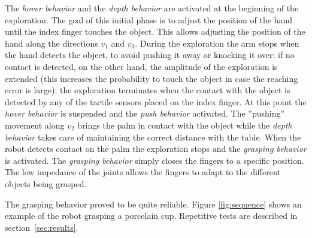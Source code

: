 The \emph{hover behavior} and the \emph{depth behavior} are activated at the 
beginning of the exploration. The goal of this initial phase is to adjust 
the position of the hand until the index finger touches the object. 
This allows adjusting the position of the hand along the directions 
$v_1$ and $v_3$. During the exploration the arm stops when the hand 
detects the object, to avoid pushing it away or knocking it over; if 
no contact is detected, on the other hand, the amplitude of the exploration 
is extended (this increases the probability to touch the object in case 
the reaching error is large); the exploration terminates when 
the contact with the object is detected by any of the tactile sensors 
placed on the index finger.
At this point the \emph{hover behavior} is suspended and the \emph{push behavior} 
activated. The ''pushing'' movement along $v_2$ brings the palm in 
contact with the object while the \emph{depth behavior} takes care of 
maintaining the correct distance with the table. When the robot detects 
contact on the palm the exploration stops and the \emph{grasping behavior} is 
activated. The \emph{grasping behavior} simply closes the fingers to a 
specific position. The low impedance of the joints allows the fingers to 
adapt to the different objects being grasped.

The grasping behavior proved to be quite reliable. Figure \ref{fig:sequence} 
shows an example of the robot grasping a porcelain cup. Repetitive tests 
are described in section~\ref{sec:results}.


